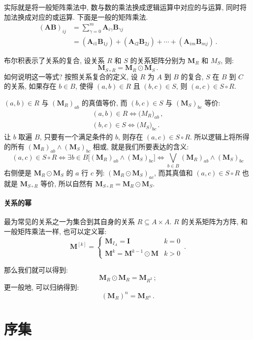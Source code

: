 \documentclass[UTF8]{ctexart}
\theoremstyle{mystyle}
\theoremstyle{myremark}
\theoremstyle{plain}
\newcommand{\ve}[1]{\boldsymbol{\mathbf{#1}}}
\begin{document}
实际就是将一般矩阵乘法中, 数与数的乘法换成逻辑运算中对应的与运算, 同时将加法换成对应的或运算. 下面是一般的矩阵乘法.
\begin{align*}
    (\ve A \ve B)_{ij} &= \sum_{\gamma = 0}^{m} \ve A_{i \gamma} \ve B_{\gamma j} \\
    &= (\ve A_{i1} \ve B_{1j}) + (\ve A_{i2} \ve B_{2j}) + \cdots + (\ve A_{im} \ve B_{mj}) \,.
\end{align*}

布尔积表示了关系的复合, 设关系 $ R $ 和 $ S $ 的关系矩阵分别为 $ \ve M_R $ 和 $ M_S $, 则:
\[ 
    \ve M_{S \circ R} = \ve M_R \odot \ve M_S \,.
\]
如何说明这一等式? 按照关系复合的定义, 设 $ R $ 为 $ A $ 到 $ B $ 的复合, $ S $ 在 $ B $ 到 $ C $ 的关系, 如果存在 $ b \in B $, 使得 $ (a, b) \in R $ 且 $ (b, c) \in S $, 则 $ (a, c) \in S \circ R $.

$ (a, b) \in R $ 与 $ (\ve M_R)_{ab} $ 的真值等价, 而 $ (b, c) \in S $ 与 $ (\ve M_S)_{bc} $ 等价:
\[ \begin{array}{c}
    (a, b) \in R \iff \ve (M_R)_{ab} \,,\\
    (b, c) \in S \iff \ve (M_S)_{bc} \,.
\end{array} \] 
让 $ b $ 取遍 $ B $, 只要有一个满足条件的 $ b $, 则存在 $ (a, c) \in S \circ R $. 所以逻辑上将所得的所有 $ (\ve M_R)_{ab} \land (\ve M_S)_{bc} $ 相或, 就是我们所要表达的含义:
\[ 
    (a, c) \in S \circ R \iff \exists b \in B \bigl[ (\ve M_R)_{ab} \land (\ve M_S)_{bc} \bigr] \iff \bigvee_{b \in B} (\ve M_R)_{ab} \land (\ve M_S)_{bc}
\]
右侧便是 $ \ve M_R \odot \ve M_S $ 的 $ a $ 行 $ c $ 列: $ (\ve M_R \odot \ve M_S)_{ac} $, 而其真值和 $ (a, c) \in S \circ R $ 也就是 $ \ve M_{S \circ R} $ 等价, 所以自然有 $ \ve M_{S \circ R} = \ve M_R \odot \ve M_S $.

\paragraph{关系的幂}
最为常见的关系之一为集合到其自身的关系 $ R \subseteq A \times A $. $ R $ 的关系矩阵为方阵, 和一般矩阵乘法一样, 也可以定义幂:
\[ \ve M^{[k]} = \begin{cases}
    \ve M_{I_A} = \ve I  & k = 0 \\
    \ve M^k = \ve M^{k - 1} \odot \ve M & k > 0
\end{cases} \,.\]

那么我们就可以得到:
\[ 
    \ve M_R \odot \ve M_R = \ve M_{R^2} \,;
\]
更一般地, 可以归纳得到:
\[ 
    (\ve M_R)^n = \ve M_{R^n} \,.
\]

\section{序集}
\end{document}
